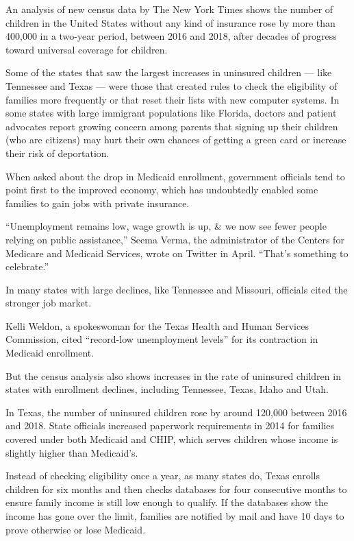 An analysis of new census data by The New York Times shows the number of
children in the United States without any kind of insurance rose by more
than 400,000 in a two-year period, between 2016 and 2018, after decades
of progress toward universal coverage for children.

Some of the states that saw the largest increases in uninsured children
--- like Tennessee and Texas --- were those that created rules to check
the eligibility of families more frequently or that reset their lists
with new computer systems. In some states with large immigrant
populations like Florida, doctors and patient advocates report growing
concern among parents that signing up their children (who are citizens)
may hurt their own chances of getting a green card or increase their
risk of deportation.

When asked about the drop in Medicaid enrollment, government officials
tend to point first to the improved economy, which has undoubtedly
enabled some families to gain jobs with private insurance.

``Unemployment remains low, wage growth is up, \& we now see fewer
people relying on public assistance,'' Seema Verma, the administrator of
the Centers for Medicare and Medicaid Services, wrote on Twitter in
April. ``That's something to celebrate.''

In many states with large declines, like Tennessee and Missouri,
officials cited the stronger job market.

Kelli Weldon, a spokeswoman for the Texas Health and Human Services
Commission, cited ``record-low unemployment levels'' for its contraction
in Medicaid enrollment.

But the census analysis also shows increases in the rate of uninsured
children in states with enrollment declines, including Tennessee, Texas,
Idaho and Utah.

In Texas, the number of uninsured children rose by around 120,000
between 2016 and 2018. State officials increased paperwork requirements
in 2014 for families covered under both Medicaid and CHIP, which serves
children whose income is slightly higher than Medicaid's.

Instead of checking eligibility once a year, as many states do, Texas
enrolls children for six months and then checks databases for four
consecutive months to ensure family income is still low enough to
qualify. If the databases show the income has gone over the limit,
families are notified by mail and have 10 days to prove otherwise or
lose Medicaid.

